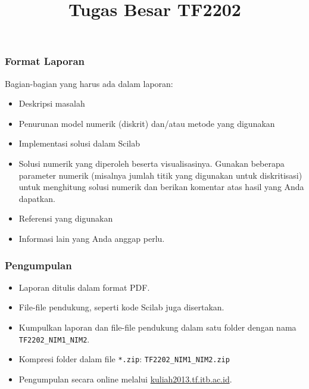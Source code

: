 \documentclass[bahasa,10pt]{beamer}
\begin{document}
\title{Tugas Besar TF2202}
\author{}
\institute{}
\date{}

\frame{\titlepage}

\begin{frame}
\frametitle{Format Laporan}

Bagian-bagian yang harus ada dalam laporan:
\begin{itemize}
\item Deskripsi masalah
\item Penurunan model numerik (diskrit) dan/atau metode yang digunakan
\item Implementasi solusi dalam Scilab
\item Solusi numerik yang diperoleh beserta visualisasinya. Gunakan beberapa
parameter numerik (misalnya jumlah titik yang digunakan untuk diskritisasi)
untuk menghitung solusi numerik dan berikan komentar atas hasil yang Anda
dapatkan.
\item Referensi yang digunakan
\item Informasi lain yang Anda anggap perlu.
\end{itemize}

\end{frame}




\begin{frame}[fragile]
\frametitle{Pengumpulan}

\begin{itemize}
\item Laporan ditulis dalam format PDF.
\item File-file pendukung, seperti kode Scilab juga disertakan.
\item Kumpulkan laporan dan file-file pendukung dalam satu folder dengan
nama \texttt{TF2202\_NIM1\_NIM2}.
\item Kompresi folder dalam file \texttt{*.zip}: {\color{blue}\texttt{TF2202\_NIM1\_NIM2.zip}}
\item Pengumpulan secara online melalui \url{kuliah2013.tf.itb.ac.id}.
\end{itemize}

\end{frame}
\end{document}
